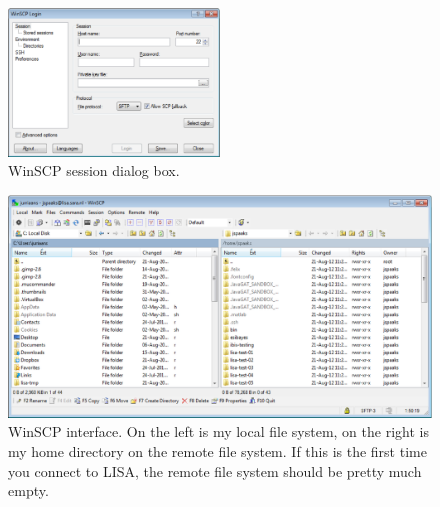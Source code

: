\begin{figure}[htbp]
  \centering
    \includegraphics[width=0.5\textwidth]{./../eps/winscp-session-dialog.eps}
  \caption{WinSCP session dialog box.}
  \label{fig:winscp-session-dialog}
\end{figure}

\begin{figure}[htbp]
  \centering
    \includegraphics[width=1.0\textwidth]{./../eps/winscp-two-panes.eps}
  \caption{WinSCP interface. On the left is my local file system, on the right is my home directory on the remote file system. If this is the first time you connect to LISA, the remote file system should be pretty much empty.}
  \label{fig:winscp-two-panes}
\end{figure}





